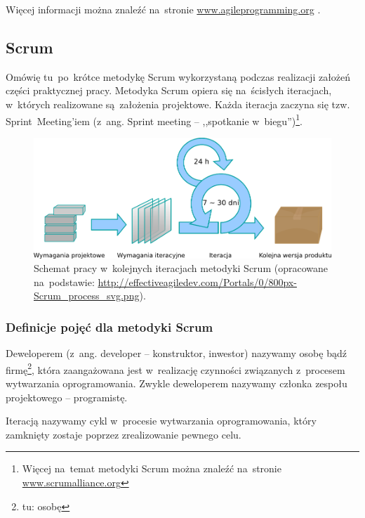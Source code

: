 Więcej informacji można znaleźć na~stronie \url{www.agileprogramming.org} \cite{agile1}.

\subsection{Scrum} \label{scrum.scrum}

Omówię tu~po~krótce metodykę Scrum wykorzystaną podczas realizacji założeń części praktycznej pracy. Metodyka Scrum opiera się na~ścisłych iteracjach, w~których realizowane są~założenia projektowe. Każda iteracja zaczyna się tzw. Sprint~Meeting'iem (z~ang. Sprint meeting -- ,,spotkanie w~biegu'')\footnote{Więcej na~temat metodyki Scrum można znaleźć na~stronie \url{www.scrumalliance.org}}.

\begin{figure}[!t]
\centering
\includegraphics[width=\textwidth]{obrazki/scrum.png}
\caption{Schemat pracy w~kolejnych iteracjach metodyki Scrum (opracowane na~podstawie: \url{http://effectiveagiledev.com/Portals/0/800px-Scrum\_process\_svg.png}).}
\label{fig.rysunek.scrum}
\end{figure}

\subsubsection{Definicje pojęć dla metodyki Scrum} \label{scrum.definicje}

\begin{definition}[Deweloper]
Deweloperem (z~ang. developer -- konstruktor, inwestor) nazywamy osobę bądź firmę\footnote{tu: osobę}, która zaangażowana jest w~realizację czynności związanych z~procesem wytwarzania oprogramowania. Zwykle deweloperem nazywamy członka zespołu projektowego -- programistę.
\end{definition}

\begin{definition}[Iteracja]
Iteracją nazywamy cykl w~procesie wytwarzania oprogramowania, który zamknięty zostaje poprzez zrealizowanie pewnego celu.
\end{definition}

